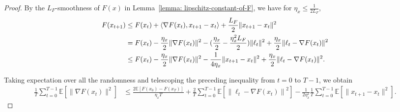 \documentclass{article}
\theoremstyle{plain}
\theoremstyle{definition}
\theoremstyle{remark}
\def\E{\mathbb E}
\begin{document}
\begin{proof}
    By the $L_F$-smoothness of $F(x)$ in Lemma~\ref{lemma: lipschitz-constant-of-F}, we have for $\eta_x \leq \frac{1}{2L_F}$,
    \begin{align}
        F(x_{t+1}) &\leq  F(x_t) + \langle \nabla F(x_t), x_{t+1} - x_t \rangle + \frac{L_F}{2}\|x_{t+1} - x_{t}\|^2 \notag \\
        & = F(x_t) - \frac{\eta_x}{2} \| \nabla F(x_t)\|^2 - (\frac{\eta_x}{2} - \frac{\eta_x^2L_F}{2} ) \| \ell_t \|^2 + \frac{\eta_x}{2} \| \ell_t - \nabla F(x_t)\|^2 \notag \\
        & \leq  F(x_t) - \frac{\eta_x}{2} \| \nabla F(x_t)\|^2 - \frac{1}{4\eta_x} \| x_{t+1} - x_t \|^2 + \frac{\eta_x}{2} \|\ell_t - \nabla F(x_t)\|^2 . 
    \end{align}

Taking expectation over all the randomness and telescoping
the preceding inequality from $t=0$ to $T-1$, we obtain
    \begin{align}
        \frac{1}{T}\sum_{t=0}^{T-1} \E \left[ \|\nabla F(x_t)  \|^2\right] & \leq \frac{2\E \left[F(x_0) - F(x_T) \right]}{\eta_x T} + \frac{2}{T} \sum_{t=0}^{T-1}\E \left[ \left\| \ell_t - \nabla F(x_t)\right\|^2  \right]- \frac{1}{2\eta_x^2} \frac{1}{T}\sum_{t=0}^{T-1}\E \left[ \| x_{t+1} - x_t \|^2\right].
    \end{align}


\end{proof}
\end{document}
